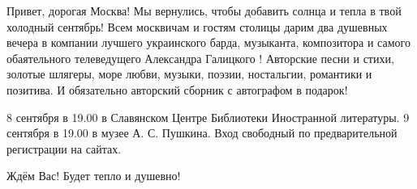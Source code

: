 Привет, дорогая Москва! Мы вернулись, чтобы добавить солнца и тепла в твой
холодный сентябрь! Всем москвичам и гостям столицы дарим два душевных вечера в
компании лучшего украинского барда, музыканта, композитора и самого
обаятельного  телеведущего Александра Галицкого ! Авторские песни и стихи,
золотые шлягеры, море любви, музыки, поэзии, ностальгии, романтики и позитива.
И обязательно авторский сборник с автографом в подарок! 

8 сентября в 19.00 в Славянском Центре Библиотеки Иностранной литературы. 9
сентября в 19.00 в музее А. С. Пушкина. Вход свободный по предварительной
регистрации на сайтах. 

Ждём Вас! Будет тепло и душевно!
